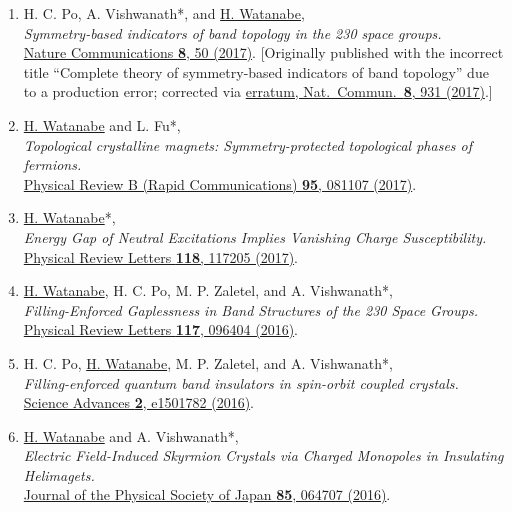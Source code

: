 \documentclass[letterpaper,11pt]{article}
\begin{document}
\begin{enumerate}
\item H. C. Po, A. Vishwanath*, and \underline{H. Watanabe}, \\\emph{Symmetry-based indicators of band topology in the 230 space groups.}\\{\href{https://doi.org/10.1038/s41467-017-00133-2}{Nature Communications {\bf 8}, 50 (2017)}.} {\small \textcolor[gray]{0.4}{[Originally published with the incorrect title ``Complete theory of symmetry-based indicators of band topology'' due to a production error; corrected via \href{https://doi.org/10.1038/s41467-017-00724-z}{erratum, Nat.\ Commun.\ {\bf 8}, 931 (2017)}.]}}

\item \underline{H. Watanabe} and L. Fu*, \\\emph{Topological crystalline magnets: Symmetry-protected topological phases of fermions.}\\{\href{https://doi.org/10.1103/PhysRevB.95.081107}{Physical Review B (Rapid Communications) {\bf 95}, 081107 (2017)}.}

\item \underline{H. Watanabe}*, \\\emph{Energy Gap of Neutral Excitations Implies Vanishing Charge Susceptibility.}\\{\href{https://doi.org/10.1103/PhysRevLett.118.117205}{Physical Review Letters {\bf 118}, 117205 (2017)}.}

\item \underline{H. Watanabe}, H. C. Po, M. P. Zaletel, and A. Vishwanath*, \\\emph{Filling-Enforced Gaplessness in Band Structures of the 230 Space Groups.}\\{\href{https://doi.org/10.1103/PhysRevLett.117.096404}{Physical Review Letters {\bf 117}, 096404 (2016)}.}

\item H. C. Po, \underline{H. Watanabe}, M. P. Zaletel, and A. Vishwanath*, \\\emph{Filling-enforced quantum band insulators in spin-orbit coupled crystals.}\\{\href{https://doi.org/10.1126/sciadv.1501782}{Science Advances {\bf 2}, e1501782 (2016)}.}

\item \underline{H. Watanabe} and A. Vishwanath*, \\\emph{Electric Field-Induced Skyrmion Crystals via Charged Monopoles in Insulating Helimagets.}\\{\href{https://doi.org/10.7566/JPSJ.85.064707}{Journal of the Physical Society of Japan {\bf 85}, 064707 (2016)}.}



\end{enumerate}
\end{document}
